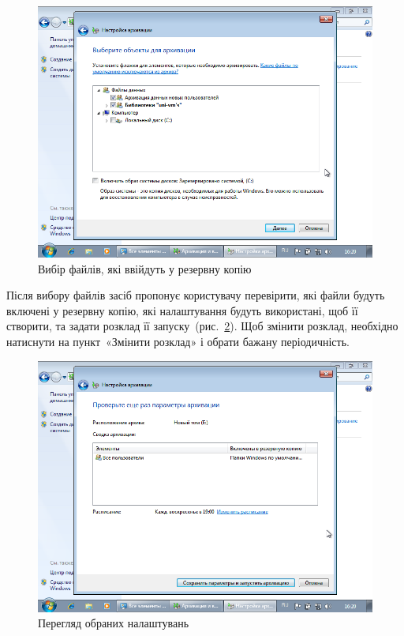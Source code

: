 \documentclass[
	a4paper,
	oneside,
	BCOR = 10mm,
	DIV = 12,
	12pt,
	headings = normal,
]{scrartcl}
\begin{document}
				\begin{figure}[!htbp]
					\centering
					\includegraphics[height=12\baselineskip]{./assets/y04s01-infosec-lab-01-03-p04.png}
					\caption{Вибір файлів, які ввійдуть у резервну копію}
					\label{fig:01-archivation-04}
				\end{figure}

				Після вибору файлів засіб пропонує користувачу перевірити, які файли будуть включені у резервну копію, які налаштування будуть використані, щоб її створити, та задати розклад її запуску~(рис.~\ref{fig:01-archivation-05}). Щоб змінити розклад, необхідно натиснути на пункт~«Змінити розклад» і обрати бажану періодичність.

				\begin{figure}[!htbp]
					\centering
					\includegraphics[height=12\baselineskip]{./assets/y04s01-infosec-lab-01-03-p05.png}
					\caption{Перегляд обраних налаштувань}
					\label{fig:01-archivation-05}
				\end{figure}
\end{document}
